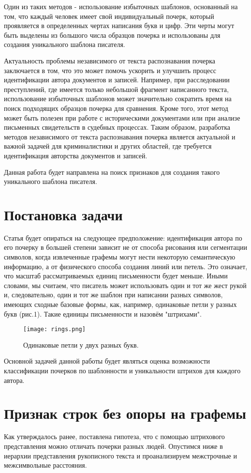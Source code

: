 \documentclass{article}
\begin{document}
Один из таких методов - использование избыточных шаблонов, основанный на том, что каждый человек имеет свой индивидуальный почерк, который проявляется в определенных чертах написания букв и цифр. Эти черты могут быть выделены из большого числа образцов почерка и использованы для создания уникального шаблона писателя.

Актуальность проблемы независимого от текста распознавания почерка заключается в том, что это может помочь ускорить и улучшить процесс идентификации автора документов и записей. Например, при расследовании преступлений, где имеется только небольшой фрагмент написанного текста, использование избыточных шаблонов может значительно сократить время на поиск подходящих образцов почерка для сравнения. Кроме того, этот метод может быть полезен при работе с историческими документами или при анализе письменных свидетельств в судебных процессах. Таким образом, разработка методов независимого от текста распознавания почерка является актуальной и важной задачей для криминалистики и других областей, где требуется идентификация авторства документов и записей.

Данная работа будет направлена на поиск признаков для создания такого уникального шаблона писателя.

\section{Постановка задачи}
Статья будет опираться на следующее предположение: идентификация автора по его почерку в большей степени зависит не от способа рисования или сегментации символов, когда извлеченные графемы могут нести некоторую семантическую информацию, а от физического способа создания линий или петель. Это означает, что масштаб рассматриваемых единиц письменности будет меньше. Иными словами, мы считаем, что писатель может использовать один и тот же жест рукой и, следовательно, один и тот же шаблон при написании разных символов, имеющих сходные базовые формы, как, например, одинаковые петли у разных букв (рис.1). Такие единицы письменности и назовём "штрихами".
\begin{figure}[h]
    \centering
    \texttt{[image: rings.png]}
    \caption{Одинаковые петли у двух разных букв.}
\end{figure}

Основной задачей данной работы будет являться оценка возможности классификации почерков по шаблонности и уникальности штрихов для каждого автора.

\section{Признак строк без опоры на графемы}
Как утверждалось ранее, поставлена гипотеза, что с помощью штрихового представления можно отличать почерки разных людей. Опустимся ниже в иерархии представления рукописного текста и проанализируем межстрочные и межсимвольные расстояния. 
\end{document}
